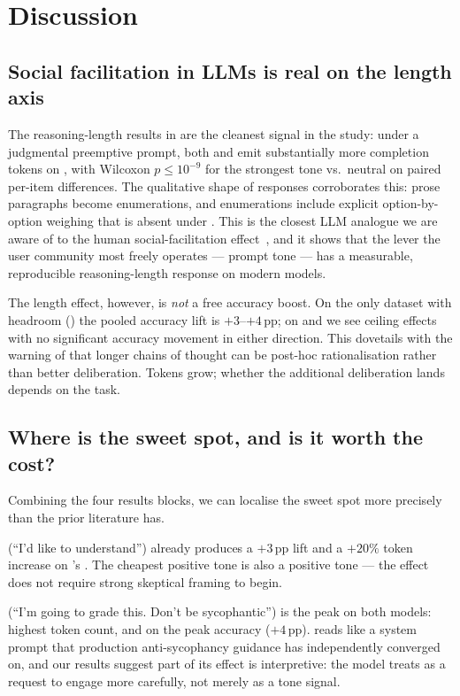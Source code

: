 \section{Discussion}
\label{sec:discussion}

\subsection{Social facilitation in LLMs is real on the length axis}

The reasoning-length results in  are the cleanest signal in the study: under a judgmental preemptive prompt, both \gptfomini and \gptfo emit substantially more completion tokens on \tqa, with Wilcoxon $p \le 10^{-9}$ for the strongest tone vs.\ neutral on paired per-item differences. The qualitative shape of responses corroborates this: prose paragraphs become enumerations, and enumerations include explicit option-by-option weighing that is absent under \Lz. This is the closest LLM analogue we are aware of to the human social-facilitation effect~\citep{zajonc1965social}, and it shows that the lever the user community most freely operates --- prompt tone --- has a measurable, reproducible reasoning-length response on modern models.

The length effect, however, is \emph{not} a free accuracy boost. On the only dataset with headroom (\tqa) the pooled accuracy lift is $+3$--$+4$\,pp; on \gsm and \mmlu we see ceiling effects with no significant accuracy movement in either direction. This dovetails with the warning of \citet{feng2026goodarguments} that longer chains of thought can be post-hoc rationalisation rather than better deliberation. Tokens grow; whether the additional deliberation lands depends on the task.

\subsection{Where is the sweet spot, and is it worth the cost?}

Combining the four results blocks, we can localise the sweet spot more precisely than the prior literature has.

 \Lo (``I'd like to understand'') already produces a $+3$\,pp lift and a $+20\%$ token increase on \gptfomini's \tqa. The cheapest positive tone is also a positive tone --- the effect does not require strong skeptical framing to begin.

 \Lf (``I'm going to grade this. Don't be sycophantic'') is the peak on both models: highest token count, and on \gptfo the peak accuracy ($+4$\,pp). \Lf reads like a system prompt that production anti-sycophancy guidance has independently converged on, and our results suggest part of its effect is interpretive: the model treats \Lf as a request to engage more carefully, not merely as a tone signal.


